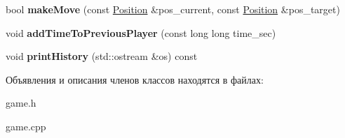 \begin{DoxyCompactItemize}
\item 
\mbox{\label{class_chess_1_1_game_ad41f5a27992a255dfda146b2955b2b08}} 
bool {\bfseries make\+Move} (const \mbox{\hyperlink{class_chess_1_1_position}{Position}} \&pos\+\_\+current, const \mbox{\hyperlink{class_chess_1_1_position}{Position}} \&pos\+\_\+target)
\item 
\mbox{\label{class_chess_1_1_game_a76a66b4e73ba5086b587dac9b5539840}} 
void {\bfseries add\+Time\+To\+Previous\+Player} (const long long time\+\_\+sec)
\item 
\mbox{\label{class_chess_1_1_game_ade1027e22302d19ac285fec5a0a3d4c5}} 
void {\bfseries print\+History} (std\+::ostream \&os) const
\end{DoxyCompactItemize}


Объявления и описания членов классов находятся в файлах\+:\begin{DoxyCompactItemize}
\item 
game.\+h\item 
game.\+cpp\end{DoxyCompactItemize}
